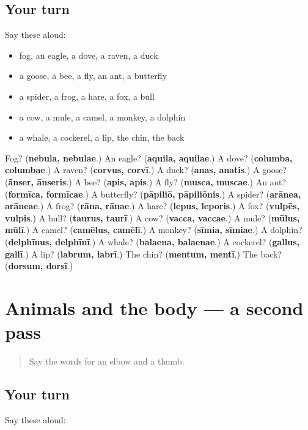 \subsection*{Your turn}
Say these aloud:

\begin{itemize}
\raggedright
  \item fog, an eagle, a dove, a raven, a duck
  \item a goose, a bee, a fly, an ant, a butterfly
  \item a spider, a frog, a hare, a fox, a bull
  \item a cow, a mule, a camel, a monkey, a dolphin
  \item a whale, a cockerel, a lip, the chin, the back
\end{itemize}

\begin{tcolorbox}[breakable,colback=teal!4,colframe=teal!35!black,title={Before you move on}]
Fog? (\textbf{nebula, nebulae}.) An eagle? (\textbf{aquila, aquilae}.) A dove? (\textbf{columba, columbae}.) A raven? (\textbf{corvus, corvī}.) A duck? (\textbf{anas, anatis}.) A goose? (\textbf{ānser, ānseris}.) A bee? (\textbf{apis, apis}.) A fly? (\textbf{musca, muscae}.) An ant? (\textbf{formīca, formīcae}.) A butterfly? (\textbf{pāpiliō, pāpiliōnis}.) A spider? (\textbf{arānea, arāneae}.) A frog? (\textbf{rāna, rānae}.) A hare? (\textbf{lepus, leporis}.) A fox? (\textbf{vulpēs, vulpis}.) A bull? (\textbf{taurus, taurī}.) A cow? (\textbf{vacca, vaccae}.) A mule? (\textbf{mūlus, mūlī}.) A camel? (\textbf{camēlus, camēlī}.) A monkey? (\textbf{sīmia, sīmiae}.) A dolphin? (\textbf{delphīnus, delphīnī}.) A whale? (\textbf{balaena, balaenae}.) A cockerel? (\textbf{gallus, gallī}.) A lip? (\textbf{labrum, labrī}.) The chin? (\textbf{mentum, mentī}.) The back? (\textbf{dorsum, dorsī}.)
\end{tcolorbox}
\section[(dialogue)]{Animals and the body — a second pass}

\label{lesson:LA-R140-second-pass-animals-and-the-body}



\begin{quote}
Say the words for an elbow and a thumb.
\end{quote}

\subsection*{Your turn}
Say these aloud:


